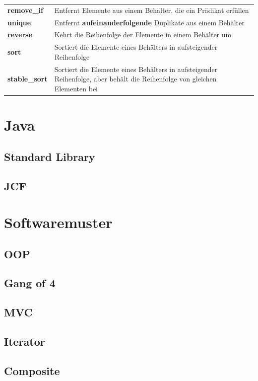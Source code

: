 \documentclass[12pt]{scrartcl}
\begin{document}
\begin{table}[H]
\begin{tabular}{ p{4cm} | p{11cm} }
		\textbf{remove\_if}   & Entfernt Elemente aus einem Behälter, die ein Prädikat erfüllen                                                            \\
		\textbf{unique}       & Entfernt \textbf{aufeinanderfolgende} Duplikate aus einem Behälter                                                         \\
		\textbf{reverse}      & Kehrt die Reihenfolge der Elemente in einem Behälter um                                                                    \\
		\textbf{sort}         & Sortiert die Elemente eines Behälters in aufsteigender Reihenfolge                                                         \\
		\textbf{stable\_sort} & Sortiert die Elemente eines Behälters in aufsteigender Reihenfolge, aber behält die Reihenfolge von gleichen Elementen bei
	\end{tabular}
\end{table}
\pagebreak

\section{Java}
\subsection{Standard Library}
\subsection{JCF}
\section{Softwaremuster}
\subsection{OOP}
\subsection{Gang of 4}
\subsection{MVC}
\subsection{Iterator}
\subsection{Composite}
\end{document}
